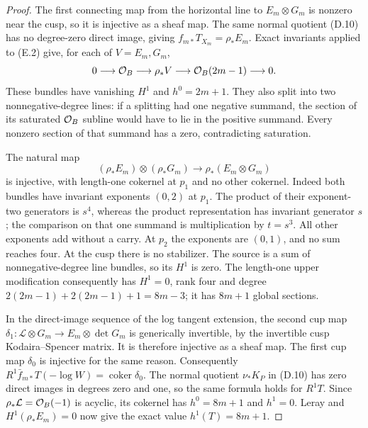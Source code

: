 \begin{proof}
The first connecting map from the horizontal line to
$E_m\otimes G_m$ is nonzero near the cusp, so it is injective as a
sheaf map. The same normal quotient (D.10) has no degree-zero direct
image, giving $f_{m*}T_{X_m}=\rho_*E_m$.
Exact invariants applied to (E.2) give, for each of $V=E_m,G_m$,
\[
 0\longrightarrow\mathcal O_B\longrightarrow\rho_*V
 \longrightarrow\mathcal O_B(2m-1)\longrightarrow0.
\]
These bundles have vanishing $H^1$ and $h^0=2m+1$.
They also split into two nonnegative-degree lines: if a splitting
had one negative summand, the section of its saturated $\mathcal O_B$
subline would have to lie in the positive summand. Every nonzero
section of that summand has a zero, contradicting saturation.

The natural map
\[
 (\rho_*E_m)\otimes(\rho_*G_m)
              \longrightarrow\rho_*(E_m\otimes G_m)
\]
is injective, with length-one cokernel at $p_1$ and no other
cokernel. Indeed both bundles have invariant exponents $(0,2)$ at
$p_1$. The product of their exponent-two generators is $s^4$,
whereas the product representation has invariant generator $s$;
the comparison on that one summand is multiplication by $t=s^3$.
All other exponents add without a carry. At $p_2$ the exponents
are $(0,1)$, and no sum reaches four. At the cusp there is no
stabilizer. The source is a sum of nonnegative-degree line bundles,
so its $H^1$ is zero. The length-one upper modification consequently
has $H^1=0$, rank four and degree
$2(2m-1)+2(2m-1)+1=8m-3$; it has $8m+1$ global sections.

In the direct-image sequence of the log tangent extension, the
second cup map
$\delta_1:\mathcal L\otimes G_m\to E_m\otimes\det G_m$
is generically invertible, by the invertible cusp Kodaira--Spencer
matrix. It is therefore injective as a sheaf map. The first cup map
$\delta_0$ is injective for the same reason. Consequently
$R^1\bar f_{m*}T(-\log W)=\operatorname{coker}\delta_0$.
The normal quotient $\nu_*K_P$ in (D.10) has zero direct images in
degrees zero and one, so the same formula holds for $R^1T$.
Since $\rho_*\mathcal L=\mathcal O_B(-1)$ is acyclic, its cokernel has
$h^0=8m+1$ and $h^1=0$. Leray and $H^1(\rho_*E_m)=0$ now give
the exact value $h^1(T)=8m+1$.


\end{proof}
